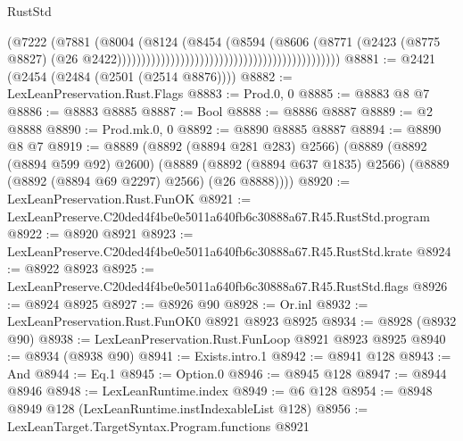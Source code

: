 \begin{lexlean}{RustStd}
\begin{coremodule}
                                                                            (@7222
                                                                              (@7881
                                                                                (@8004
                                                                                  (@8124
                                                                                    (@8454
                                                                                      (@8594
                                                                                        (@8606
                                                                                          (@8771
                                                                                            (@2423
                                                                                              (@8775
                                                                                                @8827)
                                                                                              (@26
                                                                                                @2422))))))))))))))))))))))))))))))))))))))))))))))
@8881 := @2421 (@2454 (@2484 (@2501 (@2514 @8876))))
@8882 := LexLeanPreservation.Rust.Flags
@8883 := Prod.{0, 0}
@8885 := @8883 @8 @7
@8886 := @8883 @8885
@8887 := Bool
@8888 := @8886 @8887
@8889 := @2 @8888
@8890 := Prod.mk.{0, 0}
@8892 := @8890 @8885 @8887
@8894 := @8890 @8 @7
@8919 := @8889
    (@8892 (@8894 @281 @283) @2566)
    (@8889
      (@8892 (@8894 @599 @92) @2600)
      (@8889 (@8892 (@8894 @637 @1835) @2566) (@8889 (@8892 (@8894 @69 @2297) @2566) (@26 @8888))))
@8920 := LexLeanPreservation.Rust.FunOK
@8921 := LexLeanPreserve.C20ded4f4be0e5011a640fb6c30888a67.R45.RustStd.program
@8922 := @8920 @8921
@8923 := LexLeanPreserve.C20ded4f4be0e5011a640fb6c30888a67.R45.RustStd.krate
@8924 := @8922 @8923
@8925 := LexLeanPreserve.C20ded4f4be0e5011a640fb6c30888a67.R45.RustStd.flags
@8926 := @8924 @8925
@8927 := @8926 @90
@8928 := Or.inl
@8932 := LexLeanPreservation.Rust.FunOK0 @8921 @8923 @8925
@8934 := @8928 (@8932 @90)
@8938 := LexLeanPreservation.Rust.FunLoop @8921 @8923 @8925
@8940 := @8934 (@8938 @90)
@8941 := Exists.intro.{1}
@8942 := @8941 @128
@8943 := And
@8944 := Eq.{1}
@8945 := Option.{0}
@8946 := @8945 @128
@8947 := @8944 @8946
@8948 := LexLeanRuntime.index
@8949 := @6 @128
@8954 := @8948 @8949 @128 (LexLeanRuntime.instIndexableList @128)
@8956 := LexLeanTarget.TargetSyntax.Program.functions @8921

\end{coremodule}
\end{lexlean}
